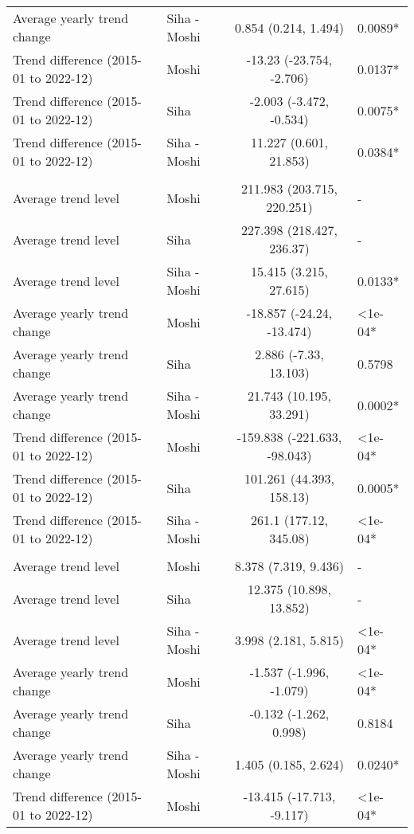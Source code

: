 \begin{longtable}{l|lcl}
Average yearly trend change & Siha - Moshi & 0.854 (0.214, 1.494) & 0.0089* \\ 
Trend difference (2015-01 to 2022-12) & Moshi & -13.23 (-23.754, -2.706) & 0.0137* \\ 
Trend difference (2015-01 to 2022-12) & Siha & -2.003 (-3.472, -0.534) & 0.0075* \\ 
Trend difference (2015-01 to 2022-12) & Siha - Moshi & 11.227 (0.601, 21.853) & 0.0384* \\ 
\midrule\addlinespace[2.5pt]
\multicolumn{4}{l}{Skin Infection - Fungal} \\[2.5pt] 
\midrule\addlinespace[2.5pt]
Average trend level & Moshi & 211.983 (203.715, 220.251) & - \\ 
Average trend level & Siha & 227.398 (218.427, 236.37) & - \\ 
Average trend level & Siha - Moshi & 15.415 (3.215, 27.615) & 0.0133* \\ 
Average yearly trend change & Moshi & -18.857 (-24.24, -13.474) & <1e-04* \\ 
Average yearly trend change & Siha & 2.886 (-7.33, 13.103) & 0.5798 \\ 
Average yearly trend change & Siha - Moshi & 21.743 (10.195, 33.291) & 0.0002* \\ 
Trend difference (2015-01 to 2022-12) & Moshi & -159.838 (-221.633, -98.043) & <1e-04* \\ 
Trend difference (2015-01 to 2022-12) & Siha & 101.261 (44.393, 158.13) & 0.0005* \\ 
Trend difference (2015-01 to 2022-12) & Siha - Moshi & 261.1 (177.12, 345.08) & <1e-04* \\ 
\midrule\addlinespace[2.5pt]
\multicolumn{4}{l}{Snake and Insect Bites} \\[2.5pt] 
\midrule\addlinespace[2.5pt]
Average trend level & Moshi & 8.378 (7.319, 9.436) & - \\ 
Average trend level & Siha & 12.375 (10.898, 13.852) & - \\ 
Average trend level & Siha - Moshi & 3.998 (2.181, 5.815) & <1e-04* \\ 
Average yearly trend change & Moshi & -1.537 (-1.996, -1.079) & <1e-04* \\ 
Average yearly trend change & Siha & -0.132 (-1.262, 0.998) & 0.8184 \\ 
Average yearly trend change & Siha - Moshi & 1.405 (0.185, 2.624) & 0.0240* \\ 
Trend difference (2015-01 to 2022-12) & Moshi & -13.415 (-17.713, -9.117) & <1e-04* \\ 

\end{longtable}
